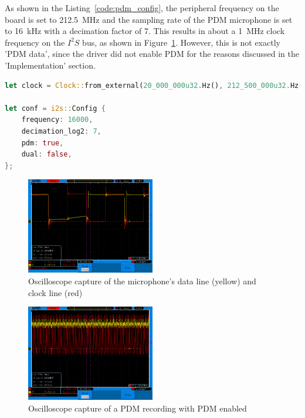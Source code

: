 As shown in the Listing~\ref{code:pdm_config}, the peripheral frequency on the board is set to \SI{212.5}{\mega\hertz}
and the sampling rate of the PDM microphone is set to \SI{16}{\kilo\hertz} with a decimation factor of 7.
This results in about a \SI{1}{\mega\hertz} clock frequency on the $I^2S$ bus, as shown in Figure~\ref{fig:i2s_capture}.
However, this is not exactly 'PDM data', since the driver did not enable PDM for the reasons discussed in the 'Implementation' section.

\begin{minipage}{\textwidth}
\begin{lstlisting}[style=colorEX,language=Rust,caption={Configuration of the board clock and the PDM driver},label={code:pdm_config}]
let clock = Clock::from_external(20_000_000u32.Hz(), 212_500_000u32.Hz());

let conf = i2s::Config {
    frequency: 16000,
    decimation_log2: 7,
    pdm: true,
    dual: false,
};
\end{lstlisting}
\end{minipage}

\begin{figure}[H]
    \begin{center}
        \includegraphics[width=0.5\textwidth]{figures/i2s_capture.png}
    \end{center}
    \caption[Oscilloscope capture of the microphone's data line (yellow) and clock line (red)]{Oscilloscope capture of the microphone's data line (yellow) and clock line (red)}
    \label{fig:i2s_capture}
\end{figure}

\begin{figure}[H]
    \begin{center}
        \includegraphics[width=0.5\textwidth]{figures/pdm_broken.png}
    \end{center}
    \caption[Oscilloscope capture of a PDM recording with PDM enabled]{Oscilloscope capture of a PDM recording with PDM enabled}
    \label{fig:pdm_no_config}
\end{figure}


